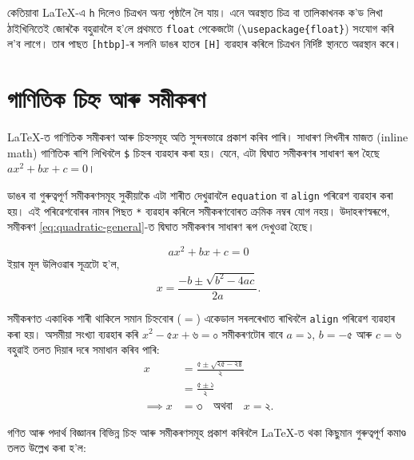 \documentclass[12pt,a4paper]{article} %
\begin{document}
	কেতিয়াবা \LaTeX{}-এ \texttt{h} দিলেও চিত্ৰখন অন্য পৃষ্ঠালৈ লৈ যায়। এনে অৱস্থাত চিত্ৰ বা তালিকাখনক ক'ড লিখা ঠাইখিনিতেই জোৰকৈ বহুৱাবলৈ হ'লে প্ৰথমতে \texttt{float} পেকেজটো (\texttt{\textbackslash usepackage\{float\}}) সংযোগ কৰি ল'ব লাগে। তাৰ পাছত \texttt{[htbp]}-ৰ সলনি ডাঙৰ হাতৰ \texttt{[H]} ব্যৱহাৰ কৰিলে চিত্ৰখন নিৰ্দিষ্ট স্থানতে অৱস্থান কৰে।
	
	\section{গাণিতিক চিহ্ন আৰু সমীকৰণ}
	
	\LaTeX{}-ত গাণিতিক সমীকৰণ আৰু চিহ্নসমূহ অতি সুন্দৰভাৱে প্ৰকাশ কৰিব পাৰি। সাধাৰণ লিখনীৰ মাজত (inline math) গাণিতিক ৰাশি লিখিবলৈ \texttt{\$} চিহ্নৰ ব্যৱহাৰ কৰা হয়। যেনে, এটা দ্বিঘাত সমীকৰণৰ সাধাৰণ ৰূপ হৈছে $ax^2+bx+c=0$।
	
	ডাঙৰ বা গুৰুত্বপূৰ্ণ সমীকৰণসমূহ সুকীয়াকৈ এটা শাৰীত দেখুৱাবলৈ \texttt{equation} বা \texttt{align} পৰিৱেশ ব্যৱহাৰ কৰা হয়। এই পৰিৱেশবোৰৰ নামৰ পিছত \texttt{*} ব্যৱহাৰ কৰিলে সমীকৰণবোৰত ক্ৰমিক নম্বৰ যোগ নহয়। উদাহৰণস্বৰূপে, সমীকৰণ \ref{eq:quadratic-general}-ত দ্বিঘাত সমীকৰণৰ সাধাৰণ ৰূপ দেখুওৱা হৈছে।
	
	\begin{equation}
		ax^2+bx+c=0
		\label{eq:quadratic-general}
	\end{equation}
	ইয়াৰ মূল উলিওৱাৰ সূত্ৰটো হ'ল,
	\begin{equation*}
		x=\frac{-b\pm\sqrt{b^2-4ac}}{2a}.
	\end{equation*}
	
	সমীকৰণত একাধিক শাৰী থাকিলে সমান চিহ্নবোৰ ($=$) একেডাল সৰলৰেখাত ৰাখিবলৈ \texttt{align} পৰিৱেশ ব্যৱহাৰ কৰা হয়। অসমীয়া সংখ্যা ব্যৱহাৰ কৰি $x^2-৫x+৬=০$ সমীকৰণটোৰ বাবে $a=১$, $b=-৫$ আৰু $c=৬$ বহুৱাই তলত দিয়াৰ দৰে সমাধান কৰিব পাৰি:
	\begin{align*}
		x &= \frac{৫\pm\sqrt{২৫-২৪}}{২}\\
		&= \frac{৫\pm১}{২}\\
		\implies x &= ৩ \quad \text{অথবা} \quad x=২.
	\end{align*}
	
	গণিত আৰু পদাৰ্থ বিজ্ঞানৰ বিভিন্ন চিহ্ন আৰু সমীকৰণসমূহ প্ৰকাশ কৰিবলৈ \LaTeX{}-ত থকা কিছুমান গুৰুত্বপূৰ্ণ কমাণ্ড তলত উল্লেখ কৰা হ'ল:
	
\end{document}
